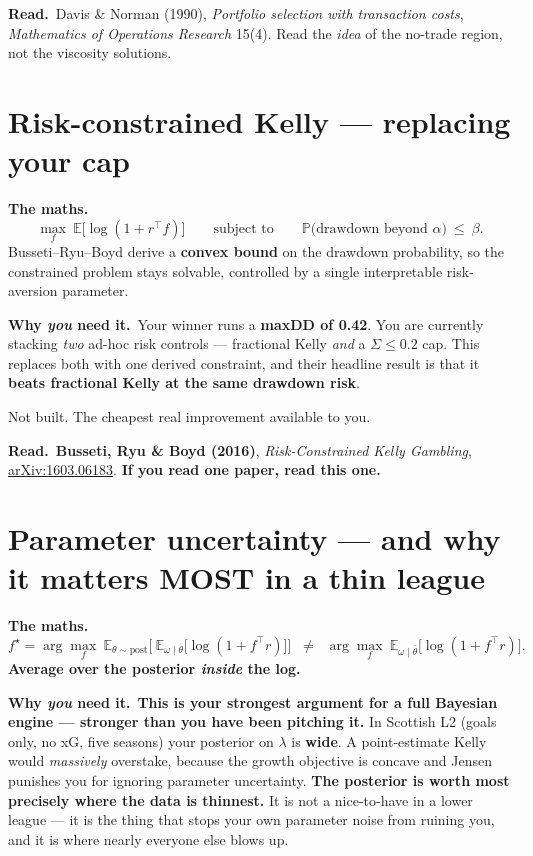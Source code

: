 \documentclass[11pt,a4paper]{article}
\newcommand{\formula}[1]{\smallskip\noindent\textbf{\small The maths.}\ #1}
\newcommand{\whyyou}[1]{\smallskip\noindent\textbf{\small Why \emph{you} need it.}\ \small #1\normalsize}
\newcommand{\reads}[1]{\smallskip\noindent\textbf{\small Read.}\ \small #1\normalsize}
\begin{document}
\reads{Davis \& Norman (1990), \emph{Portfolio selection with transaction costs}, \emph{Mathematics of
Operations Research} 15(4). Read the \emph{idea} of the no-trade region, not the viscosity solutions.}

\section{Risk-constrained Kelly --- replacing your cap}

\formula{
\[
  \max_f\ \mathbb{E}\big[\log(1 + r^\top f)\big]
  \qquad\text{subject to}\qquad
  \mathbb{P}\big(\text{drawdown beyond } \alpha\big)\ \le\ \beta .
\]
Busseti--Ryu--Boyd derive a \textbf{convex bound} on the drawdown probability, so the constrained problem
stays solvable, controlled by a single interpretable risk-aversion parameter.}

\whyyou{Your winner runs a \textbf{maxDD of 0.42}. You are currently stacking \emph{two} ad-hoc risk controls
--- fractional Kelly \emph{and} a $\Sigma \le 0.2$ cap. This replaces both with one derived constraint, and
their headline result is that it \textbf{beats fractional Kelly at the same drawdown risk}.}

\begin{gapbox}
Not built. The cheapest real improvement available to you.
\end{gapbox}

\reads{\textbf{Busseti, Ryu \& Boyd (2016)}, \emph{Risk-Constrained Kelly Gambling},
\href{https://arxiv.org/abs/1603.06183}{arXiv:1603.06183}. \textbf{If you read one paper, read this one.}}

\section{Parameter uncertainty --- and why it matters MOST in a thin league}

\formula{
\[
  f^\star = \arg\max_f\
  \mathbb{E}_{\theta \sim \text{post}}\Big[\ \mathbb{E}_{\omega \mid \theta}\big[\log(1 + f^\top r)\big]\Big]
  \;\;\ne\;\;
  \arg\max_f\ \mathbb{E}_{\omega \mid \bar\theta}\big[\log(1 + f^\top r)\big].
\]
\textbf{Average over the posterior \emph{inside} the log.}}

\whyyou{\textbf{This is your strongest argument for a full Bayesian engine --- stronger than you have been
pitching it.} In Scottish L2 (goals only, no xG, five seasons) your posterior on $\lambda$ is \textbf{wide}.
A point-estimate Kelly would \emph{massively} overstake, because the growth objective is concave and Jensen
punishes you for ignoring parameter uncertainty. \textbf{The posterior is worth most precisely where the data
is thinnest.} It is not a nice-to-have in a lower league --- it is the thing that stops your own parameter
noise from ruining you, and it is where nearly everyone else blows up.}
\end{document}
